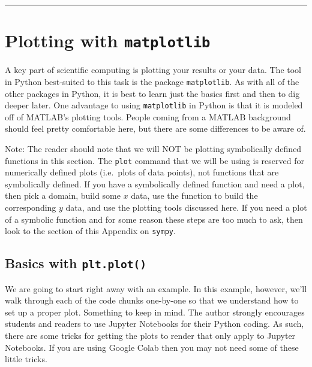\documentclass[
]{book}
\theoremstyle{definition}
\theoremstyle{definition}
\theoremstyle{definition}
\theoremstyle{remark}
\begin{document}
\begin{center}\rule{0.5\linewidth}{0.5pt}\end{center}

\hypertarget{plotting-with-matplotlib}{%
\section{\texorpdfstring{Plotting with \texttt{matplotlib}}{Plotting with matplotlib}}\label{plotting-with-matplotlib}}

A key part of scientific computing is plotting your results or your data. The tool in Python best-suited to this task is the package \texttt{matplotlib}. As with all of the other packages in Python, it is best to learn just the basics first and then to dig deeper later. One advantage to using \texttt{matplotlib} in Python is that it is modeled off of MATLAB's plotting tools. People coming from a MATLAB background should feel pretty comfortable here, but there are some differences to be aware of.

Note: The reader should note that we will NOT be plotting symbolically defined functions in this section. The \texttt{plot} command that we will be using is reserved for numerically defined plots (i.e.~plots of data points), not functions that are symbolically defined. If you have a symbolically defined function and need a plot, then pick a domain, build some \(x\) data, use the function to build the corresponding \(y\) data, and use the plotting tools discussed here. If you need a plot of a symbolic function and for some reason these steps are too much to ask, then look to the section of this Appendix on \texttt{sympy}.

\hypertarget{basics-with-plt.plot}{%
\subsection{\texorpdfstring{Basics with \texttt{plt.plot()}}{Basics with plt.plot()}}\label{basics-with-plt.plot}}

We are going to start right away with an example. In this example, however, we'll walk through each of the code chunks one-by-one so that we understand how to set up a proper plot. Something to keep in mind. The author strongly encourages students and readers to use Jupyter Notebooks for their Python coding. As such, there are some tricks for getting the plots to render that only apply to Jupyter Notebooks. If you are using Google Colab then you may not need some of these little tricks.
\end{document}

